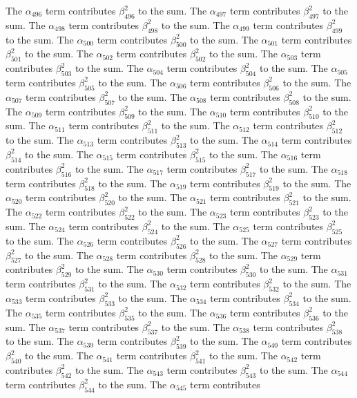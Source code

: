 \begin{lemma}
The $\alpha_{496}$ term contributes $\beta_{496}^{2}$ to the sum. The $\alpha_{497}$ term contributes $\beta_{497}^{2}$ to the sum. The $\alpha_{498}$ term contributes $\beta_{498}^{2}$ to the sum. The $\alpha_{499}$ term contributes $\beta_{499}^{2}$ to the sum. The $\alpha_{500}$ term contributes $\beta_{500}^{2}$ to the sum. The $\alpha_{501}$ term contributes $\beta_{501}^{2}$ to the sum. The $\alpha_{502}$ term contributes $\beta_{502}^{2}$ to the sum. The $\alpha_{503}$ term contributes $\beta_{503}^{2}$ to the sum. The $\alpha_{504}$ term contributes $\beta_{504}^{2}$ to the sum. The $\alpha_{505}$ term contributes $\beta_{505}^{2}$ to the sum. The $\alpha_{506}$ term contributes $\beta_{506}^{2}$ to the sum. The $\alpha_{507}$ term contributes $\beta_{507}^{2}$ to the sum. The $\alpha_{508}$ term contributes $\beta_{508}^{2}$ to the sum. The $\alpha_{509}$ term contributes $\beta_{509}^{2}$ to the sum. The $\alpha_{510}$ term contributes $\beta_{510}^{2}$ to the sum. The $\alpha_{511}$ term contributes $\beta_{511}^{2}$ to the sum. The $\alpha_{512}$ term contributes $\beta_{512}^{2}$ to the sum. The $\alpha_{513}$ term contributes $\beta_{513}^{2}$ to the sum. The $\alpha_{514}$ term contributes $\beta_{514}^{2}$ to the sum. The $\alpha_{515}$ term contributes $\beta_{515}^{2}$ to the sum. The $\alpha_{516}$ term contributes $\beta_{516}^{2}$ to the sum. The $\alpha_{517}$ term contributes $\beta_{517}^{2}$ to the sum. The $\alpha_{518}$ term contributes $\beta_{518}^{2}$ to the sum. The $\alpha_{519}$ term contributes $\beta_{519}^{2}$ to the sum. The $\alpha_{520}$ term contributes $\beta_{520}^{2}$ to the sum. The $\alpha_{521}$ term contributes $\beta_{521}^{2}$ to the sum. The $\alpha_{522}$ term contributes $\beta_{522}^{2}$ to the sum. The $\alpha_{523}$ term contributes $\beta_{523}^{2}$ to the sum. The $\alpha_{524}$ term contributes $\beta_{524}^{2}$ to the sum. The $\alpha_{525}$ term contributes $\beta_{525}^{2}$ to the sum. The $\alpha_{526}$ term contributes $\beta_{526}^{2}$ to the sum. The $\alpha_{527}$ term contributes $\beta_{527}^{2}$ to the sum. The $\alpha_{528}$ term contributes $\beta_{528}^{2}$ to the sum. The $\alpha_{529}$ term contributes $\beta_{529}^{2}$ to the sum. The $\alpha_{530}$ term contributes $\beta_{530}^{2}$ to the sum. The $\alpha_{531}$ term contributes $\beta_{531}^{2}$ to the sum. The $\alpha_{532}$ term contributes $\beta_{532}^{2}$ to the sum. The $\alpha_{533}$ term contributes $\beta_{533}^{2}$ to the sum. The $\alpha_{534}$ term contributes $\beta_{534}^{2}$ to the sum. The $\alpha_{535}$ term contributes $\beta_{535}^{2}$ to the sum. The $\alpha_{536}$ term contributes $\beta_{536}^{2}$ to the sum. The $\alpha_{537}$ term contributes $\beta_{537}^{2}$ to the sum. The $\alpha_{538}$ term contributes $\beta_{538}^{2}$ to the sum. The $\alpha_{539}$ term contributes $\beta_{539}^{2}$ to the sum. The $\alpha_{540}$ term contributes $\beta_{540}^{2}$ to the sum. The $\alpha_{541}$ term contributes $\beta_{541}^{2}$ to the sum. The $\alpha_{542}$ term contributes $\beta_{542}^{2}$ to the sum. The $\alpha_{543}$ term contributes $\beta_{543}^{2}$ to the sum. The $\alpha_{544}$ term contributes $\beta_{544}^{2}$ to the sum. The $\alpha_{545}$ term contributes 
\end{lemma}
